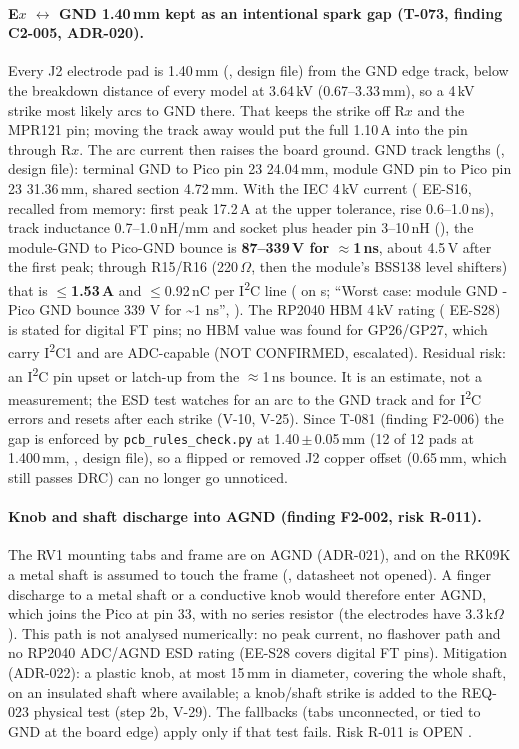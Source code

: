 \paragraph{E$x$ $\leftrightarrow$ GND 1.40\,mm kept as an intentional spark gap
(T-073, finding C2-005, ADR-020).} Every J2 electrode pad is 1.40\,mm
(, design file) from the GND edge track, below the breakdown
distance of every model at 3.64\,kV (0.67--3.33\,mm), so a 4\,kV strike most likely
arcs to GND there. That keeps the strike off R$x$ and the MPR121 pin; moving the
track away would put the full 1.10\,A into the pin through R$x$. The arc current
then raises the board ground. GND track lengths (, design file):
terminal GND to Pico pin 23 24.04\,mm, module GND pin to Pico pin 23 31.36\,mm,
shared section 4.72\,mm. With the IEC 4\,kV current ( EE-S16, recalled
from memory: first peak 17.2\,A at the upper tolerance, rise 0.6--1.0\,ns), track
inductance 0.7--1.0\,nH/mm and socket plus header pin 3--10\,nH (),
the module-GND to Pico-GND bounce is \textbf{87--339\,V for $\approx$1\,ns}, about
4.5\,V after the first peak; through R15/R16 (220\,$\Omega$, then the module's
BSS138 level shifters) that is \textbf{$\le$1.53\,A} and $\le$0.92\,nC per
I\textsuperscript{2}C line ( on s; ``Worst case:
module GND - Pico GND bounce 339 V for \textasciitilde1 ns'',
). The RP2040 HBM 4\,kV rating
( EE-S28) is stated for digital FT pins; no HBM value was found for
GP26/GP27, which carry I\textsuperscript{2}C1 and are ADC-capable (NOT CONFIRMED,
escalated). Residual risk: an I\textsuperscript{2}C pin upset or latch-up from the
$\approx$1\,ns bounce. It is an estimate, not a measurement; the ESD test watches
for an arc to the GND track and for I\textsuperscript{2}C errors and resets after
each strike (V-10, V-25). Since T-081 (finding F2-006) the gap is enforced by
\nolinkurl{pcb_rules_check.py} at 1.40\,$\pm$\,0.05\,mm (12 of 12 pads at 1.400\,mm,
, design file), so a flipped or removed J2 copper offset (0.65\,mm,
which still passes DRC) can no longer go unnoticed.

\paragraph{Knob and shaft discharge into AGND (finding F2-002, risk R-011).} The
RV1 mounting tabs and frame are on AGND (ADR-021), and on the RK09K a metal shaft is
assumed to touch the frame (, datasheet not opened). A finger
discharge to a metal shaft or a conductive knob would therefore enter AGND, which
joins the Pico at pin 33, with no series resistor (the electrodes have
3.3\,k$\Omega$). This path is not analysed numerically: no peak current, no
flashover path and no RP2040 ADC/AGND ESD rating (EE-S28 covers digital FT pins).
Mitigation (ADR-022): a plastic knob, at most 15\,mm in diameter, covering the whole
shaft, on an insulated shaft where available; a knob/shaft strike is added to the
REQ-023 physical test (step 2b, V-29). The fallbacks (tabs unconnected, or tied to
GND at the board edge) apply only if that test fails. Risk R-011 is OPEN
.

